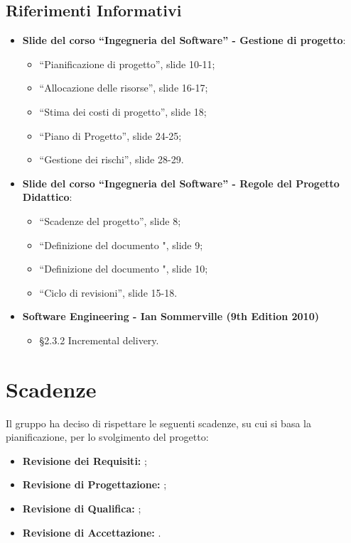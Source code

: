 \documentclass[PianoDiProgetto.tex]{subfiles}
\begin{document}
\subsection{Riferimenti Informativi}
\begin{itemize}
	\item \textbf{Slide del corso ``Ingegneria del Software'' - Gestione di progetto}:
	\begin{itemize}
		\item ``Pianificazione di progetto'', slide 10-11;
		\item ``Allocazione delle risorse'', slide 16-17;
		\item ``Stima dei costi di progetto'', slide 18;
		\item ``Piano di Progetto'', slide 24-25;
		\item ``Gestione dei rischi'', slide 28-29.
	\end{itemize}
	\item \textbf{Slide del corso ``Ingegneria del Software'' - Regole del Progetto Didattico}:\\
	\begin{itemize}
		\item ``Scadenze del progetto'', slide 8;
		\item ``Definizione del documento \tb", slide 9;
		\item ``Definizione del documento \pb", slide 10;
		\item ``Ciclo di revisioni'', slide 15-18.
	\end{itemize}
	\item \textbf{Software Engineering - Ian Sommerville (9th Edition 2010)}\\
		\begin{itemize}
			\item \S2.3.2 Incremental delivery.
		\end{itemize}

\end{itemize}

\section{Scadenze}
\label{scadenze}
Il gruppo \gruppo ha deciso di rispettare le seguenti scadenze, su cui si basa la pianificazione, per lo svolgimento del progetto:
\begin{itemize}
	\item \textbf{Revisione dei Requisiti:} ;
	\item \textbf{Revisione di Progettazione:} ;
	\item \textbf{Revisione di Qualifica:} ;
	\item \textbf{Revisione di Accettazione:} .
\end{itemize}
\end{document}
